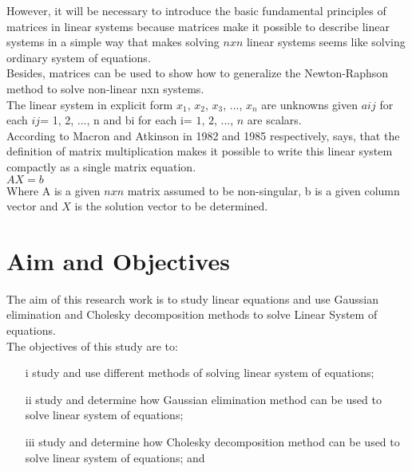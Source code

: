 \documentclass[a4paper, 12pt]{report}
\begin{document}
{          However, it will be necessary to introduce the basic fundamental principles of matrices in linear systems because matrices make it possible to describe linear systems in a simple way that makes solving $n x n$ linear systems seems like solving ordinary system of equations.\\
          
          Besides, matrices can be used to show how to generalize the Newton-Raphson method to solve non-linear nxn systems.\\
          
          The linear system in explicit form $x_1$, $x_2$, $x_3$, ..., $x_n$ are unknowns given $aij$ for each $ij$= 1, 2, ..., n and bi for each i= $1$, $2$, ..., $n$ are scalars.\\
          
          According to Macron and Atkinson in 1982 and 1985 respectively, says, that the definition of matrix multiplication makes it possible to write this linear system compactly as a single matrix equation.\\
          
          $AX=b$\\
          
          Where A is a given $n x n$ matrix assumed to be non-singular, b is a given column vector and $X$ is the solution vector to be determined.
          
          \section{Aim and Objectives}
                    
          The aim of this research work is to study linear equations and use Gaussian elimination and Cholesky decomposition methods to solve Linear System of equations.\\
          
          
          The objectives of this study are to:
          \begin{enumerate}
          	\item[i] study and use different methods of solving linear system of equations;
          	
          	\item[ii] study and determine how Gaussian elimination method can be used to solve linear system of equations;
          	
          	\item[iii] study and determine how Cholesky decomposition method can be used to solve linear system of equations; and
          	

\end{enumerate}}
\end{document}

